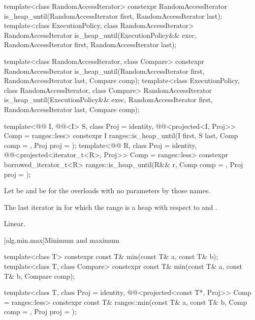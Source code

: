 %
\begin{itemdecl}
template<class RandomAccessIterator>
  constexpr RandomAccessIterator
    is_heap_until(RandomAccessIterator first, RandomAccessIterator last);
template<class ExecutionPolicy, class RandomAccessIterator>
  RandomAccessIterator
    is_heap_until(ExecutionPolicy&& exec,
                  RandomAccessIterator first, RandomAccessIterator last);

template<class RandomAccessIterator, class Compare>
  constexpr RandomAccessIterator
    is_heap_until(RandomAccessIterator first, RandomAccessIterator last,
                  Compare comp);
template<class ExecutionPolicy, class RandomAccessIterator, class Compare>
  RandomAccessIterator
    is_heap_until(ExecutionPolicy&& exec,
                  RandomAccessIterator first, RandomAccessIterator last,
                  Compare comp);

template<@@ I, @@<I> S, class Proj = identity,
         @@<projected<I, Proj>> Comp = ranges::less>
  constexpr I ranges::is_heap_until(I first, S last, Comp comp = {}, Proj proj = {});
template<@@ R, class Proj = identity,
         @@<projected<iterator_t<R>, Proj>> Comp = ranges::less>
  constexpr borrowed_iterator_t<R>
    ranges::is_heap_until(R&& r, Comp comp = {}, Proj proj = {});
\end{itemdecl}

\begin{itemdescr}
\pnum
Let  be 
and  be 
for the overloads with no parameters by those names.

\pnum
\returns
The last iterator  in 
for which the range 
is a heap with respect to  and .

\pnum
\complexity
Linear.
\end{itemdescr}


[alg.min.max]{Minimum and maximum}

%
\begin{itemdecl}
template<class T>
  constexpr const T& min(const T& a, const T& b);
template<class T, class Compare>
  constexpr const T& min(const T& a, const T& b, Compare comp);

template<class T, class Proj = identity,
         @@<projected<const T*, Proj>> Comp = ranges::less>
  constexpr const T& ranges::min(const T& a, const T& b, Comp comp = {}, Proj proj = {});
\end{itemdecl}

